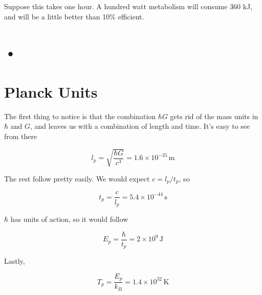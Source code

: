 \documentclass[12pt]{article}
\begin{document}
Suppose this takes one hour. A hundred watt metabolism will consume 360 kJ, and will be a little better than 10\% efficient.


\section{•}

\section{Planck Units}

The first thing to notice is that the combination \(\hbar G\) gets rid of the mass units in \(\hbar\) and \(G\), and leaves us with a combination of length and time. It's easy to see from there 

\[ l_p = \sqrt{\frac{\hbar G}{c^3}} = 1.6 \times 10^{-35} \,\mathrm{m}
\]

The rest follow pretty easily. We would expect \(c = l_p/t_p\), so 

\[ t_p = \frac{c}{l_p} = 5.4 \times 10^{-44} \, \mathrm{s}
\]

\(\hbar\) has units of action, so it would follow

\[ E_p = \frac{\hbar}{t_p} = 2 \times 10^9 \,\mathrm{J}
\]

Lastly, 

\[ T_p = \frac{E_p}{k_B} = 1.4 \times 10^{32}\,\mathrm{K}
\]
\end{document}
